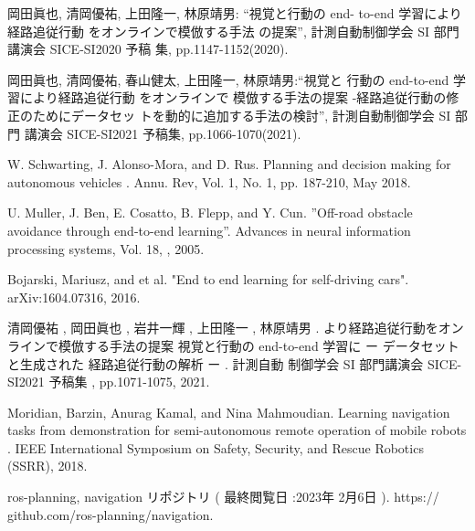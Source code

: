 \documentclass{jarticle}
\begin{document}
\footnotesize
\begin{thebibliography}{99}

岡田眞也, 清岡優祐, 上田隆一, 林原靖男: “視覚と行動の end-
to-end 学習により経路追従行動 をオンラインで模倣する手法
の提案”, 計測自動制御学会 SI 部門講演会 SICE-SI2020 予稿
集, pp.1147-1152(2020).

岡田眞也, 清岡優祐, 春山健太, 上田隆一, 林原靖男:“視覚と
行動の end-to-end 学習により経路追従行動 をオンラインで
模倣する手法の提案 -経路追従行動の修正のためにデータセッ
トを動的に追加する手法の検討”, 計測自動制御学会 SI 部門
講演会 SICE-SI2021 予稿集, pp.1066-1070(2021).

W. Schwarting, J. Alonso-Mora, and D. Rus.
Planning and decision making for
autonomous vehicles . Annu. Rev, Vol. 1, No. 1, pp. 187-210, May 2018.

U. Muller, J. Ben, E. Cosatto, B. Flepp, and Y. Cun. ”Oﬀ-road obstacle avoidance
through end-to-end learning”. Advances in neural information processing systems,
Vol. 18, , 2005.

Bojarski, Mariusz, and et al.
"End to end learning for self-driving cars".
arXiv:1604.07316, 2016.

清岡優祐 , 岡田眞也 , 岩井一輝 , 上田隆一 , 林原靖男 .
より経路追従行動をオンラインで模倣する手法の提案
視覚と行動の end-to-end 学習に
ー データセットと生成された
経路追従行動の解析 ー . 計測自動 制御学会 SI 部門講演会 SICE-SI2021 予稿集 , pp.1071-1075, 2021.

Moridian, Barzin, Anurag Kamal, and Nina Mahmoudian.
Learning navigation
tasks from demonstration for semi-autonomous remote operation of mobile robots .
IEEE International Symposium on Safety, Security, and Rescue Robotics (SSRR),
2018.

ros-planning, navigation リポジトリ ( 最終閲覧日 :2023年 2月6日 ). https://
github.com/ros-planning/navigation.

\end{thebibliography}

\normalsize
\end{document}
